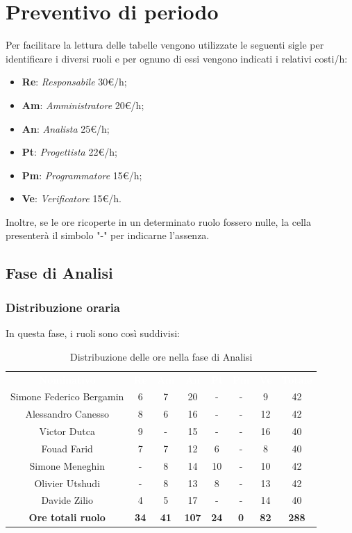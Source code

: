 \section{Preventivo di periodo}
Per facilitare la lettura delle tabelle vengono utilizzate le seguenti sigle per identificare i diversi ruoli e per ognuno di essi vengono indicati i relativi costi/h: \begin{itemize}
\item \textbf{Re}: \textit{Responsabile} 30€/h;
\item \textbf{Am}: \textit{Amministratore} 20€/h;
\item \textbf{An}: \textit{Analista} 25€/h;
\item \textbf{Pt}: \textit{Progettista} 22€/h;
\item \textbf{Pm}: \textit{Programmatore} 15€/h;
\item \textbf{Ve}: \textit{Verificatore} 15€/h.
\end{itemize}
Inoltre, se le ore ricoperte in un determinato ruolo fossero nulle, la cella presenterà il simbolo "-" per indicarne l'assenza.
 
\subsection{Fase di Analisi}
\subsubsection{Distribuzione oraria}
In questa fase, i ruoli sono così suddivisi:
\begin{table}[H]
\centering\renewcommand{\arraystretch}{1.5}
\caption{Distribuzione delle ore nella fase di Analisi}
\vspace{0.2cm}
\begin{tabular}{ c c c c c c c c }
\rowcolor{redafk}
\textcolor{white}{\textbf{Nominativo}} & \textcolor{white}{\textbf{Re}} &
\textcolor{white}{\textbf{Am}} & \textcolor{white}{\textbf{An}} &
\textcolor{white}{\textbf{Pt}} & \textcolor{white}{\textbf{Pm}} &
\textcolor{white}{\textbf{Ve}} & \textcolor{white}{\textbf{Totale}} \\
Simone Federico Bergamin & 6 & 7 & 20 & - & - & 9 & 42 \\
Alessandro Canesso & 8 & 6 & 16 & - & - & 12 & 42 \\
Victor Dutca & 9 & - & 15 & - & - & 16 & 40 \\
Fouad Farid & 7 & 7 & 12 & 6 & - & 8 & 40 \\
Simone Meneghin & - & 8 & 14 & 10 & - & 10 & 42 \\
Olivier Utshudi & - & 8 & 13 & 8 & - & 13 & 42 \\
Davide Zilio & 4 & 5 & 17 & - & - & 14 & 40 \\
\rowcolor{lastrowcolor}
\textbf{Ore totali ruolo} & \textbf{34} & \textbf{41} & \textbf{107} & \textbf{24} & \textbf{0} & \textbf{82} & \textbf{288} \\
\end{tabular}
\end{table}
 
